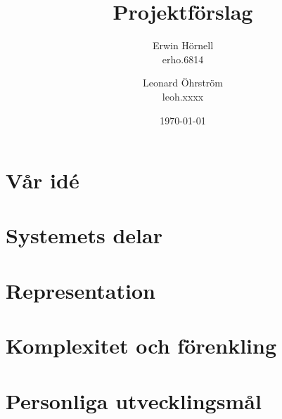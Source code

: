 \documentclass[a4paper,12pt]{article}
\title{Projektförslag}
\author{
Erwin Hörnell \\
erho.6814
\and
Leonard Öhrström \\
leoh.xxxx
}
\date{\today}
\begin{document}
\maketitle
\newpage
\section{Vår idé}
\section{Systemets delar}
\section{Representation}
\section{Komplexitet och förenkling}
\section{Personliga utvecklingsmål}
\end{document}
